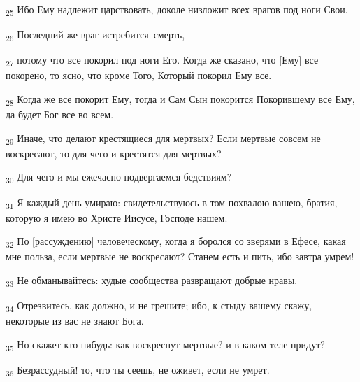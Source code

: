 \begin{tcolorbox}
\textsubscript{25} Ибо Ему надлежит царствовать, доколе низложит всех врагов под ноги Свои.
\end{tcolorbox}
\begin{tcolorbox}
\textsubscript{26} Последний же враг истребится--смерть,
\end{tcolorbox}
\begin{tcolorbox}
\textsubscript{27} потому что все покорил под ноги Его. Когда же сказано, что [Ему] все покорено, то ясно, что кроме Того, Который покорил Ему все.
\end{tcolorbox}
\begin{tcolorbox}
\textsubscript{28} Когда же все покорит Ему, тогда и Сам Сын покорится Покорившему все Ему, да будет Бог все во всем.
\end{tcolorbox}
\begin{tcolorbox}
\textsubscript{29} Иначе, что делают крестящиеся для мертвых? Если мертвые совсем не воскресают, то для чего и крестятся для мертвых?
\end{tcolorbox}
\begin{tcolorbox}
\textsubscript{30} Для чего и мы ежечасно подвергаемся бедствиям?
\end{tcolorbox}
\begin{tcolorbox}
\textsubscript{31} Я каждый день умираю: свидетельствуюсь в том похвалою вашею, братия, которую я имею во Христе Иисусе, Господе нашем.
\end{tcolorbox}
\begin{tcolorbox}
\textsubscript{32} По [рассуждению] человеческому, когда я боролся со зверями в Ефесе, какая мне польза, если мертвые не воскресают? Станем есть и пить, ибо завтра умрем!
\end{tcolorbox}
\begin{tcolorbox}
\textsubscript{33} Не обманывайтесь: худые сообщества развращают добрые нравы.
\end{tcolorbox}
\begin{tcolorbox}
\textsubscript{34} Отрезвитесь, как должно, и не грешите; ибо, к стыду вашему скажу, некоторые из вас не знают Бога.
\end{tcolorbox}
\begin{tcolorbox}
\textsubscript{35} Но скажет кто-нибудь: как воскреснут мертвые? и в каком теле придут?
\end{tcolorbox}
\begin{tcolorbox}
\textsubscript{36} Безрассудный! то, что ты сеешь, не оживет, если не умрет.
\end{tcolorbox}
